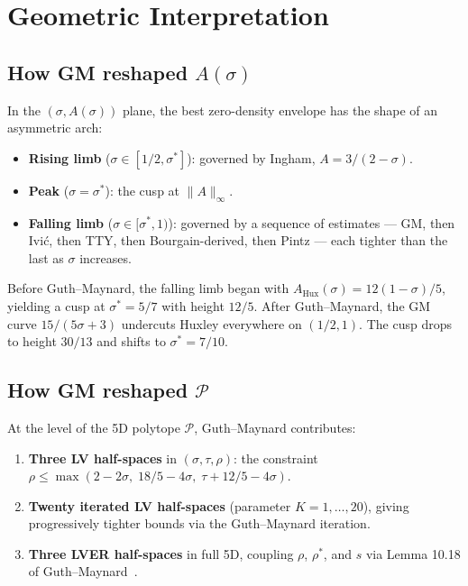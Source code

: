 \documentclass[11pt,a4paper]{article}
\begin{document}
\section{Geometric Interpretation}

\subsection*{How GM reshaped $A(\sigma)$}

In the $(\sigma, A(\sigma))$ plane, the best zero-density envelope has the shape of an asymmetric arch:
\begin{itemize}
  \item \textbf{Rising limb} ($\sigma \in [1/2, \sigma^{*}]$): governed by Ingham, $A = 3/(2-\sigma)$.
  \item \textbf{Peak} ($\sigma = \sigma^{*}$): the cusp at $\|A\|_{\infty}$.
  \item \textbf{Falling limb} ($\sigma \in [\sigma^{*}, 1)$): governed by a sequence of estimates --- GM, then Ivi\'c, then TTY, then Bourgain-derived, then Pintz --- each tighter than the last as $\sigma$ increases.
\end{itemize}

Before Guth--Maynard, the falling limb began with $A_{\mathrm{Hux}}(\sigma) = 12(1-\sigma)/5$, yielding a cusp at $\sigma^{*} = 5/7$ with height $12/5$.  After Guth--Maynard, the GM curve $15/(5\sigma + 3)$ undercuts Huxley everywhere on $(1/2, 1)$.  The cusp drops to height $30/13$ and shifts to $\sigma^{*} = 7/10$.

\subsection*{How GM reshaped $\mathcal{P}$}

At the level of the 5D polytope $\mathcal{P}$, Guth--Maynard contributes:
\begin{enumerate}
  \item \textbf{Three LV half-spaces} in $(\sigma, \tau, \rho)$: the constraint $\rho \le \max(2 - 2\sigma,\; 18/5 - 4\sigma,\; \tau + 12/5 - 4\sigma)$.
  \item \textbf{Twenty iterated LV half-spaces} (parameter $K = 1, \ldots, 20$), giving progressively tighter bounds via the Guth--Maynard iteration.
  \item \textbf{Three LVER half-spaces} in full 5D, coupling $\rho$, $\rho^{*}$, and $s$ via Lemma 10.18 of Guth--Maynard~\cite{GM24}.
\end{enumerate}
\end{document}
